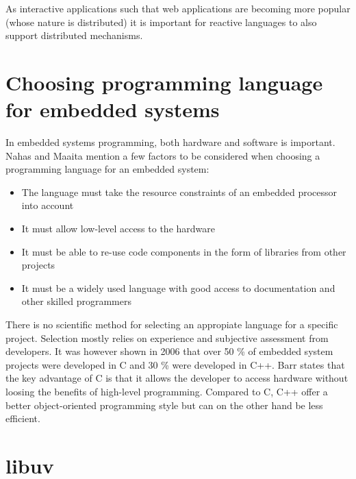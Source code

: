 As interactive applications such that web applications are becoming more
popular (whose nature is distributed) it is important for reactive languages to
also support distributed mechanisms.

\section{Choosing programming language for embedded systems}

In embedded systems programming, both hardware and software is important. Nahas
and Maaita \cite{nahas2012choosing} mention a few factors to be considered when
choosing a programming language for an embedded system:

\begin{itemize}
\item
  The language must take the resource constraints of an embedded processor
  into account
\item
  It must allow low-level access to the hardware
\item
  It must be able to re-use code components in the form of libraries from other
    projects
\item
  It must be a widely used language with good access to documentation and other
    skilled programmers
\end{itemize}

There is no scientific method for selecting an appropiate language for a
specific project. Selection mostly relies on experience and subjective
assessment from developers. It was however shown in 2006 that over 50 \% of
embedded system projects were developed in C and 30 \% were developed in C++.
Barr \cite{barr1999programming} states that the key advantage of C is that it
allows the developer to access hardware without loosing the benefits of
high-level programming. Compared to C, C++ offer a better object-oriented
programming style but can on the other hand be less efficient.
\cite{nahas2012choosing}

\section{libuv}


